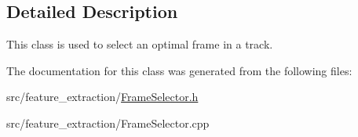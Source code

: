 \subsection{Detailed Description}
This class is used to select an optimal frame in a track. 

The documentation for this class was generated from the following files\+:\begin{DoxyCompactItemize}
\item 
src/feature\+\_\+extraction/\mbox{\hyperlink{_frame_selector_8h}{Frame\+Selector.\+h}}\item 
src/feature\+\_\+extraction/Frame\+Selector.\+cpp\end{DoxyCompactItemize}
